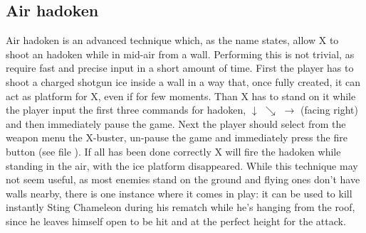 \subsection{Air hadoken}
Air hadoken is an advanced technique which, as the name states, allow X to shoot an hadoken while in mid-air from a wall. Performing this is not trivial, as require fast and precise input in a short amount of time. First the player has to shoot a charged shotgun ice inside a wall in a way that, once fully created, it can act as platform for X, even if for few moments. Than X has to stand on it while the player input the first three commands for hadoken, $\downarrow$ $\searrow$ $\rightarrow$ (facing right) and then immediately pause the game. Next the player should select from the weapon menu the X-buster, un-pause the game and immediately press the fire button (see file ). If all has been done correctly X will fire the hadoken while standing in the air, with the ice platform disappeared. While this technique may not seem useful, as most enemies stand on the ground and flying ones don't have walls nearby, there is one instance where it comes in play: it can be used to kill instantly Sting Chameleon during his rematch while he's hanging from the roof, since he leaves himself open to be hit and at the perfect height for the attack.

